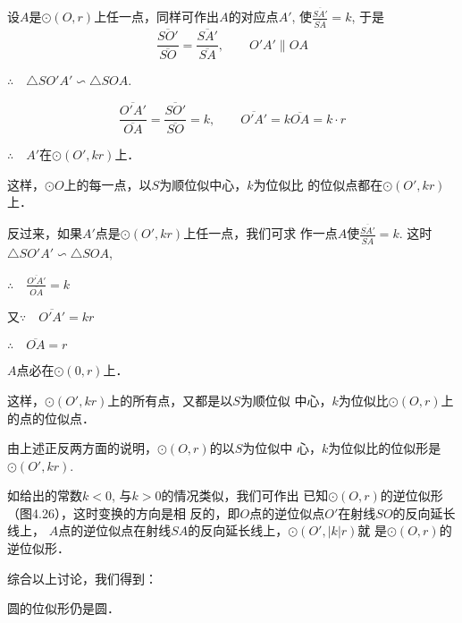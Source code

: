 设$A$是$\odot (O,r)$上任一点，同样可作出$A$的对应点$A'$, 
使$\frac{\overline{SA'}}{\overline{SA}}=k$, 于是
\[\frac{\overline{SO'}}{\overline{SO}}=\frac{\overline{SA'}}{\overline{SA}},\qquad O'A'\parallel OA\]

$\therefore\quad \triangle SO'A'\backsim \triangle SOA$.

\[\frac{\overline{O'A'}}{\overline{OA}}=\frac{\overline{SO'}}{\overline{SO}}=k,\qquad \overline{O'A'}=k\overline{OA}=k\cdot r\]

$\therefore \quad A'$在$\odot (O',kr)$上．

这样，$\odot O$上的每一点，以$S$为顺位似中心，$k$为位似比
的位似点都在$\odot (O',kr)$上．

反过来，如果$A'$点是$\odot (O',kr)$上任一点，我们可求
作一点$A$使$\frac{\overline{SA'}}{\overline{SA}}=k$. 这时$\triangle SO'A'\backsim \triangle SOA$,

$\therefore \quad \frac{\overline{O'A'}}{\overline{OA}}=k$

又$\because\quad \overline{O'A'}=kr$

$\therefore\quad \overline{OA}=r$

$A$点必在$\odot (0,r)$上．

这样，$\odot (O',kr)$上的所有点，又都是以$S$为顺位似
中心，$k$为位似比$\odot (O,r)$上的点的位似点．

由上述正反两方面的说明，$\odot (O,r)$的以$S$为位似中
心，$k$为位似比的位似形是$\odot (O',kr)$.

如给出的常数$k<0$, 与$k>0$的情况类似，我们可作出
已知$\odot (O,r)$的逆位似形（图4.26），这时变换的方向是相
反的，即$O$点的逆位似点$O'$在射线$SO$的反向延长线上，
$A$点的逆位似点在射线$SA$的反向延长线上，$\odot (O',|k|r)$就
是$\odot (O,r)$的逆位似形．

\begin{figure}[htp]
    \centering
    \caption{}
  \end{figure}



综合以上讨论，我们得到：
\begin{blk}{}
    圆的位似形仍是圆．
\end{blk}

